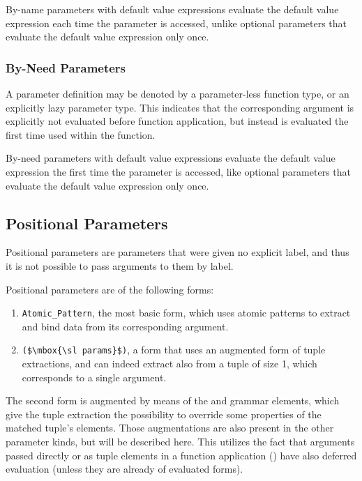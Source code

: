 By-name parameters with default value expressions evaluate the default value expression each time the parameter is accessed, unlike optional parameters that evaluate the default value expression only once. 






\subsubsection{By-Need Parameters}
\label{sec:by-need-parameters}

A parameter definition may be denoted by a parameter-less function type, or an explicitly lazy parameter type. This indicates that the corresponding argument is explicitly not evaluated before function application, but instead is evaluated the first time used within the function. 

By-need parameters with default value expressions evaluate the default value expression the first time the parameter is accessed, like optional parameters that evaluate the default value expression only once. 





\subsection{Positional Parameters}
\label{sec:positional-parameters}

Positional parameters are parameters that were given no explicit label, and thus it is not possible to pass arguments to them by label. %

Positional parameters are of the following forms:
\begin{enumerate}
  \item \lstinline!Atomic_Pattern!, the most basic form, which uses atomic patterns to extract and bind data from its corresponding argument. 
  \item \lstinline!($\mbox{\sl params}$)!, a form that uses an augmented form of tuple extractions, and can indeed extract also from a tuple of size 1, which corresponds to a single argument. 
\end{enumerate}

The second form is augmented by means of the  and  grammar elements, which give the tuple extraction the possibility to override some properties of the matched tuple's elements. Those augmentations are also present in the other parameter kinds, but will be described here. This utilizes the fact that arguments passed directly or as tuple elements in a function application () have also deferred evaluation (unless they are already of evaluated forms). 

